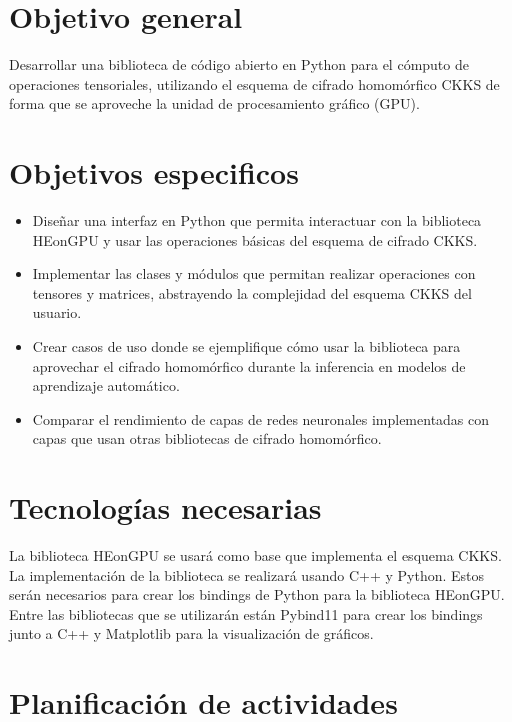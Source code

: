 \section{Objetivo general}

Desarrollar una biblioteca de código abierto en Python para el cómputo de operaciones tensoriales, utilizando el esquema de cifrado homomórfico CKKS de forma que se aproveche la unidad de procesamiento gráfico (GPU).

\section{Objetivos especificos}

\begin{itemize}
    \item Diseñar una interfaz en Python que permita interactuar con la biblioteca HEonGPU y usar las operaciones básicas del esquema de cifrado CKKS.
    \item Implementar las clases y módulos que permitan realizar operaciones con tensores y matrices, abstrayendo la complejidad del esquema CKKS del usuario.
    \item Crear casos de uso donde se ejemplifique cómo usar la biblioteca para aprovechar el cifrado homomórfico durante la inferencia en modelos de aprendizaje automático.
    \item Comparar el rendimiento de capas de redes neuronales implementadas con capas que usan otras bibliotecas de cifrado homomórfico.
\end{itemize}

\section{Tecnologías necesarias}

La biblioteca HEonGPU se usará como base que implementa el esquema CKKS. La implementación de la biblioteca se realizará usando C++ y Python. Estos serán necesarios para crear los bindings de Python para la biblioteca HEonGPU. Entre las bibliotecas que se utilizarán están Pybind11 para crear los bindings junto a C++ y Matplotlib para la visualización de gráficos.

\section{Planificación de actividades}

